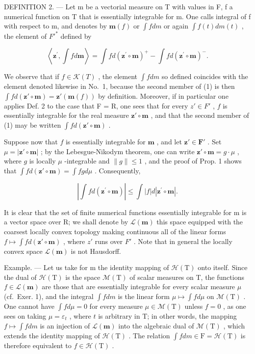 DEFINITION 2. --- Let m be a vectorial measure on T with values in F, f a numerical function on T that is essentially integrable for m. One calls integral of f with respect to m, and denotes by \(\mathbf{m}(f)\) or \(\int f dm\) or again \(\int f(t) dm(t)\) , the element of \(F'^{*}\) defined by

\[
\left\langle \mathbf {z} ^ {\prime}, \int f d \mathbf {m} \right\rangle = \int f d (\mathbf {z} ^ {\prime} \circ \mathbf {m}) ^ {+} - \int f d (\mathbf {z} ^ {\prime} \circ \mathbf {m}) ^ {-}.\tag{1}
\]

We observe that if \(f \in \mathcal{K}(T)\) , the element \(\int f dm\) so defined coincides with the element denoted likewise in No.~1, because the second member of (1) is then \(\int f d(\mathbf{z}' \circ \mathbf{m}) = \mathbf{z}'(\mathbf{m}(f))\) by definition. Moreover, if in particular one applies Def. 2 to the case that F = R, one sees that for every \(z' \in F'\) , \(f\) is essentially integrable for the real measure \(\mathbf{z}' \circ \mathbf{m}\) , and that the second member of (1) may be written \(\int f d(\mathbf{z}' \circ \mathbf{m})\) .

Suppose now that \(f\) is essentially integrable for \(\mathbf{m}\) , and let \(\mathbf{z}' \in \mathbf{F}'\) . Set \(\mu = |\mathbf{z}' \circ \mathbf{m}|\) ; by the Lebesgue-Nikodym theorem, one can write \(\mathbf{z}' \circ \mathbf{m} = g \cdot \mu\) , where \(g\) is locally \(\mu\) -integrable and \(\| g \| \leqslant 1\) , and the proof of Prop. 1 shows that \(\int f d(\mathbf{z}' \circ \mathbf{m}) = \int fg d\mu\) . Consequently,

\[
\left| \int f d (\mathbf {z} ^ {\prime} \circ \mathbf {m}) \right| \leqslant \int | f | d | \mathbf {z} ^ {\prime} \circ \mathbf {m} |.\tag{2}
\]

It is clear that the set of finite numerical functions essentially integrable for m is a vector space over R; we shall denote by \(\mathcal{L}(\mathbf{m})\) this space equipped with the coarsest locally convex topology making continuous all of the linear forms \(f \mapsto \int f d(\mathbf{z}' \circ \mathbf{m})\) , where \(z'\) runs over \(F'\) . Note that in general the locally convex space \(\mathcal{L}(\mathbf{m})\) is not Hausdorff.

Example. --- Let us take for m the identity mapping of \(\mathcal{H}(\mathrm{T})\) onto itself. Since the dual of \(\mathcal{H}(\mathrm{T})\) is the space \(\mathcal{M}(\mathrm{T})\) of scalar measures on T, the functions \(f \in \mathcal{L}(\mathbf{m})\) are those that are essentially integrable for every scalar measure \(\mu\) (cf.~Exer. 1), and the integral \(\int f dm\) is the linear form \(\mu \mapsto \int f d\mu\) on \(\mathcal{M}(\mathrm{T})\) . One cannot have \(\int f d\mu = 0\) for every measure \(\mu \in \mathcal{M}(\mathrm{T})\) unless \(f = 0\) , as one sees on taking \(\mu = \varepsilon_t\) , where \(t\) is arbitrary in T; in other words, the mapping \(f \mapsto \int f dm\) is an injection of \(\mathcal{L}(\mathbf{m})\) into the algebraic dual of \(\mathcal{M}(\mathrm{T})\) , which extends the identity mapping of \(\mathcal{H}(\mathrm{T})\) . The relation \(\int f dm \in \mathrm{F} = \mathcal{H}(\mathrm{T})\) is therefore equivalent to \(f \in \mathcal{H}(\mathrm{T})\) .

